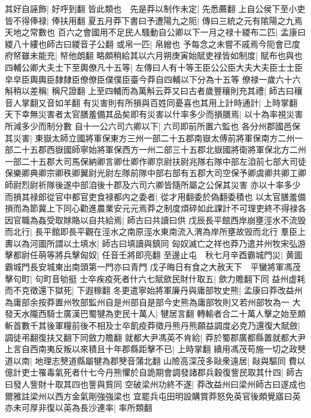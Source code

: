 其好自誣飾|{
	好呼到翻}
皆此類也　先是莽以制作未定|{
	先悉薦翻}
上自公侯下至小吏皆不得俸禄|{
	俸扶用翻}
夏五月莽下書曰予遭陽九之阨|{
	傳曰三統之元有隂陽之九焉天地之常數也}
百六之會國用不足民人騷動自公卿以下一月之禄十緵布二匹|{
	孟康曰緵八十縷也師古曰緵音子公翻}
或帛一匹|{
	帛繒也}
予每念之未嘗不戚焉今阨會已度府帑雖未能充|{
	帑他朗翻}
略頗稍給其以六月朔庚寅始賦吏禄皆如制度|{
	賦布也與也}
四輔公卿大夫士下至輿僚凡十五等|{
	左傳曰人有十等王臣公公臣大夫大夫臣士士臣皁皁臣輿輿臣隸隸臣僚僚臣僕僕臣臺今莽自四輔以下分為十五等}
僚禄一歲六十六斛稍以差稱|{
	稱尺證翻}
上至四輔而為萬斛云莽又曰古者歲豐穰則充其禮|{
	師古曰穰音人掌翻又音如羊翻}
有災害則有所損與百姓同憂喜也其用上計時通計|{
	上時掌翻}
天下幸無災害者太官膳羞備其品矣即有災害以什率多少而損膳焉|{
	以十為率視災害所減多少而制分數}
自十一公六司六卿以下|{
	六司即前所置六監也}
各分州郡國邑保其災害|{
	東嶽太師立國將軍保東方三州一部二十五郡南嶽太傅前將軍保南方二州一部二十五郡西嶽國師寧始將軍保西方一州二部三十五郡北嶽國將衛將軍保北方二州一部二十五郡大司馬保納卿言卿仕卿作卿京尉扶尉兆隊右隊中部左洎前七部大司徒保樂卿典卿宗卿秩卿翼尉光尉左隊前隊中部右部有五郡大司空保予卿虞卿共卿工卿師尉烈尉祈隊後遂中部洎後十郡及六司六卿皆隨所屬之公保其災害}
亦以十率多少而損其禄郎從官中都官吏食禄都内之委者|{
	從才用翻委於偽翻委積也}
以太官膳羞備損而為節冀上下同心勸進農業安元元焉莽之制度煩碎如此課計不可理吏終不得禄各因官職為姦受取賕賂以自共給焉|{
	師古曰共讀曰供}
戊辰長平館西岸崩壅涇水不流毁而北行|{
	長平館即長平觀在涇水之南原涇水東南流入渭為岸所壅故毁而北行}
羣臣上夀以為河圖所謂以土填水|{
	師古曰填讀與鎮同}
匈奴滅亡之祥也莽乃遣并州牧宋弘游擊都尉任萌等將兵擊匈奴|{
	任音壬將即亮翻}
至邊止屯　秋七月辛酉霸城門災|{
	黄圖霸城門長安城東出南頭第一門亦曰青門}
戊子晦日有食之大赦天下　平蠻將軍馮茂擊句町|{
	句町音劬挺}
士卒疾疫死者什六七賦歛民財什取五|{
	歛力贍翻下同}
益州虚耗而不克徵還下獄死|{
	下遐稼翻}
冬更遣寧始將軍廉丹與庸部牧史熊|{
	孟康曰莽改益州為庸部余按莽置州牧部監州自是州部自是部今史熊為庸部牧則又若州部牧為一}
大發天水隴西騎士廣漢巴蜀犍為吏民十萬人|{
	犍居言翻}
轉輸者合二十萬人擊之始至頗斬首數千其後軍糧前後不相及士卒飢疫莽徵丹熊丹熊願益調度必克乃還復大賦斂|{
	調徒弔翻復扶又翻下同斂力贍翻}
就都大尹馮英不肯給|{
	莽於蜀郡廣都縣置就都大尹}
上言自西南夷反叛以來積且十年郡縣距擊不已|{
	上時掌翻}
續用馮茂苟施一切之政僰道以南|{
	地理志僰道縣屬犍為郡僰音蒲北翻}
山險高深茂多敺衆遠居|{
	敺與驅同}
費以億計吏士罹毒氣死者什七今丹熊懼於自詭期會調發諸郡兵穀復訾民取其什四|{
	師古曰發人訾財十取其四也訾與貲同}
空破梁州功終不遂|{
	莽改益州曰梁州師古曰遂成也爾雅註梁州以西方金氣剛強強梁也}
宜罷兵屯田明設購賞莽怒免英官後頗覺寤曰英亦未可厚非復以英為長沙連率|{
	率所類翻}
